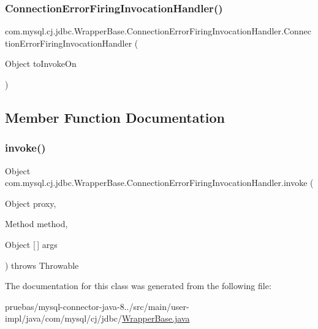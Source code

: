 \subsubsection{\texorpdfstring{Connection\+Error\+Firing\+Invocation\+Handler()}{ConnectionErrorFiringInvocationHandler()}}
{\footnotesize\ttfamily com.\+mysql.\+cj.\+jdbc.\+Wrapper\+Base.\+Connection\+Error\+Firing\+Invocation\+Handler.\+Connection\+Error\+Firing\+Invocation\+Handler (\begin{DoxyParamCaption}\item[{Object}]{to\+Invoke\+On }\end{DoxyParamCaption})}



\subsection{Member Function Documentation}
\mbox{\label{classcom_1_1mysql_1_1cj_1_1jdbc_1_1_wrapper_base_1_1_connection_error_firing_invocation_handler_a227a5a682614df2dc9e4587f89e1c9a8}} 
\subsubsection{\texorpdfstring{invoke()}{invoke()}}
{\footnotesize\ttfamily Object com.\+mysql.\+cj.\+jdbc.\+Wrapper\+Base.\+Connection\+Error\+Firing\+Invocation\+Handler.\+invoke (\begin{DoxyParamCaption}\item[{Object}]{proxy,  }\item[{Method}]{method,  }\item[{Object \mbox{[}$\,$\mbox{]}}]{args }\end{DoxyParamCaption}) throws Throwable}



The documentation for this class was generated from the following file\+:\begin{DoxyCompactItemize}
\item 
pruebas/mysql-\/connector-\/java-\/8../src/main/user-\/impl/java/com/mysql/cj/jdbc/\mbox{\hyperlink{_wrapper_base_8java}{Wrapper\+Base.\+java}}\end{DoxyCompactItemize}
